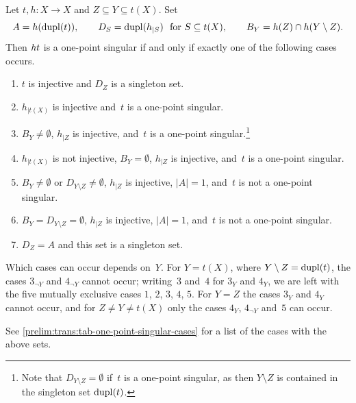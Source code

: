\begin{proposition} \label{prelim:prop:comp-one-point-singular-cases}
	Let $t, h \colon X \to X$ and $Z \subseteq Y \subseteq t(X)$.
	Set
	\[
	A = h(\dupl{t}), \qquad
	D_S = \dupl{h_{|S}} \ \text{ for } S \subseteq t(X), \qquad
	B_Y = h(Z) \cap h(Y \setminus Z).
	\]
	Then $\concat{t}{h}$ is a one-point singular if and only if exactly one of the
	following cases occurs.
	\begin{enumerate}
		\item[$1$.] $t$ is injective and $D_Z$ is a singleton set.
		
		\item[$2$.] $h_{|t(X)}$ is injective and~$t$ is a one-point singular.
		
		\item[$3_Y$.] $B_Y \ne \emptyset$, $h_{|Z}$ is injective, and~$t$ is a
		one-point singular.\footnote{Note that $D_{Y \setminus Z} = \emptyset$
			if~$t$ is a one-point singular, as then $Y \setminus Z$ is contained in
			the singleton set $\dupl{t}$.}
		
		\item[$3_{\lnot Y}$.] $h_{|t(X)}$ is not injective, $B_Y = \emptyset$,
		$h_{|Z}$ is injective, and~$t$ is a one-point singular.
		
		\item[$4_Y$.] $B_Y \ne \emptyset$ or $D_{Y \setminus Z} \ne \emptyset$,
		$h_{|Z}$ is injective, $|A| = 1$, and~$t$ is not a one-point singular.
		
		\item[$4_{\lnot Y}$.] $B_Y = D_{Y \setminus Z} = \emptyset$,
		$h_{|Z}$ is injective, $|A| = 1$, and~$t$ is not a one-point singular.
		
		\item[$5$.] $D_Z = A$ and this set is a singleton set.
	\end{enumerate}
	Which cases can occur depends on~$Y$.
	For $Y = t(X)$, where $Y \setminus Z = \dupl{t}$, the cases $3_{\lnot Y}$
	and $4_{\lnot Y}$ cannot occur; writing~$3$ and~$4$ for $3_Y$ and $4_Y$, we
	are left with the five mutually exclusive cases $1$, $2$, $3$, $4$, $5$.
	For $Y = Z$ the cases $3_Y$ and $4_Y$ cannot occur, and for
	$Z \ne Y \ne t(X)$ only the cases $4_Y$, $4_{\lnot Y}$ and~$5$ can occur.
	
	See \cref{prelim:trans:tab-one-point-singular-cases} for a list of the cases
	with the above sets.
\end{proposition}
